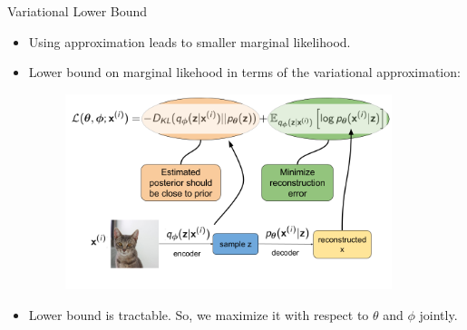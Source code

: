 \documentclass{beamer}
\begin{document}


\begin{frame}{Variational Lower Bound}
    \begin{itemize}
        \item{
            Using approximation leads to smaller marginal likelihood.
        }
        \item{
        Lower bound on marginal likehood in terms of the variational approximation:
        }

        \begin{figure}
            \includegraphics[width=0.9\textwidth]{lower_bound2}
        \end{figure}

        \item{
            Lower bound is tractable. So, we maximize it with respect to $\theta$ and $\phi$ jointly.
        }
    \end{itemize}

\end{frame}
\end{document}
